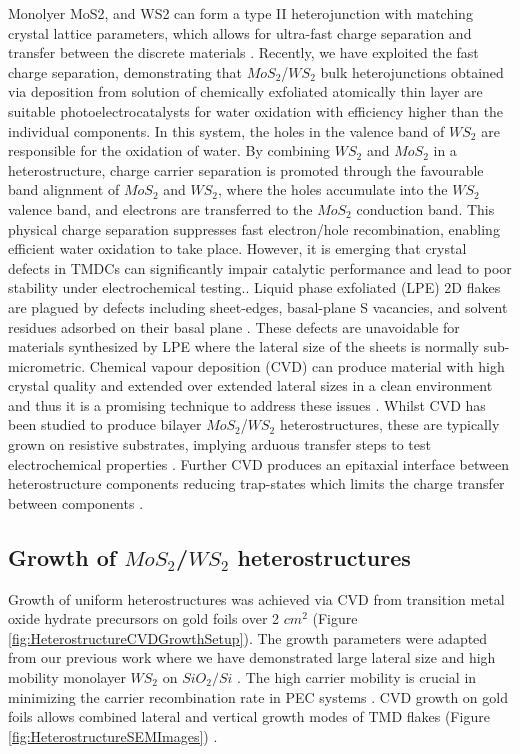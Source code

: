 Monolyer MoS2, and WS2 can form a type II heterojunction with matching crystal lattice parameters, which allows for ultra-fast charge separation and transfer between the discrete materials \cite{Chen2016}\cite{Wang2013}. Recently, we have exploited the fast charge separation, demonstrating that $MoS_2$/$WS_2$ bulk heterojunctions obtained via deposition from solution of chemically exfoliated atomically thin layer  are suitable photoelectrocatalysts for water oxidation \cite{Pesci2017} with efficiency higher than the individual components. In this system, the holes in the valence band of $WS_2$ are responsible for the oxidation of water. By combining $WS_2$ and $MoS_2$ in a heterostructure, charge carrier separation is promoted through the favourable band alignment of $MoS_2$ and $WS_2$, where the holes accumulate into the $WS_2$ valence band, and electrons are transferred to the $MoS_2$ conduction band. This physical charge separation suppresses fast electron/hole recombination, enabling efficient water oxidation to take place.
However, it is emerging that crystal defects in TMDCs can significantly impair catalytic performance and lead to poor stability under electrochemical testing.\cite{Yu2017}\cite{Voiry2016}\cite{Parzinger2015}\cite{Yu2017a}\cite{Raza2016}. Liquid phase exfoliated (LPE) 2D flakes are plagued by defects including sheet-edges, basal-plane S vacancies, and solvent residues adsorbed on their basal plane \cite{Yu2017}\cite{Yu2016}\cite{Sivula2016}. These defects are unavoidable for materials synthesized by LPE where the lateral size of the sheets is normally sub-micrometric. Chemical vapour deposition (CVD) can produce material with high crystal quality and extended over extended lateral sizes in a clean environment and thus it is a promising technique to address these issues \cite{Reale2017}. Whilst CVD has been studied to produce bilayer $MoS_2$/$WS_2$ heterostructures, these are typically grown on resistive substrates, implying arduous transfer steps to test electrochemical properties \cite{Chen2015}. Further CVD produces an epitaxial interface between heterostructure components reducing trap-states which limits the charge transfer between components \cite{Tan2018}.
 
\subsection{Growth of $MoS_2$/$WS_2$ heterostructures}

Growth of uniform heterostructures was achieved via CVD from transition metal oxide hydrate precursors on gold foils over 2 $cm^2$ (Figure \ref{fig:HeterostructureCVDGrowthSetup}). The growth parameters were adapted from our previous work where we have demonstrated large lateral size and high mobility monolayer $WS_2$ on $SiO_2/Si$ \cite{Reale2017}. The high carrier mobility is crucial in minimizing the carrier recombination rate in PEC systems \cite{Li2015a}. CVD growth on gold foils allows combined lateral and vertical growth modes of TMD flakes (Figure \ref{fig:HeterostructureSEMImages}) \cite{Shi2014}.

